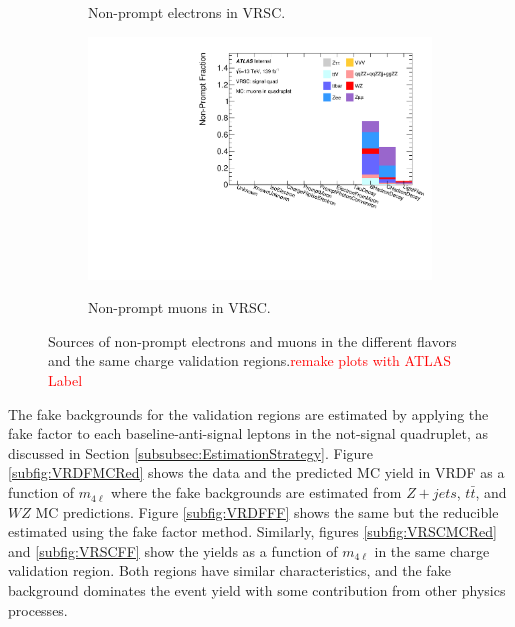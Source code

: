 \begin{figure}[htb]
\begin{subfigure}{.48\textwidth}
    \caption{Non-prompt electrons in VRSC.}
    \end{subfigure}
    \begin{subfigure}{.48\textwidth}
        \centering
        {\includegraphics[width=.9\linewidth]{figures/Analysis/Background/NonPromptCRSCSignal_Muons_.pdf}}\\
        \caption{Non-prompt muons in VRSC.}
    \end{subfigure}
    \caption{ Sources of non-prompt electrons and muons in the different flavors and the same charge validation regions.\textcolor{red}{remake plots with ATLAS Label} \label{fig:VRNonPromptComposition}}
\end{figure}

The fake backgrounds for the validation regions are estimated by applying the fake factor to each baseline-anti-signal leptons in the not-signal quadruplet, as discussed in Section \ref{subsubsec:EstimationStrategy}. Figure \ref{subfig:VRDFMCRed} shows the data and the predicted MC yield in VRDF as a function of $m_{4\ell}$ where the fake backgrounds are estimated from $Z+jets$, $t\bar{t}$, and $WZ$ MC predictions. Figure \ref{subfig:VRDFFF} shows the same but the reducible estimated using the fake factor method. Similarly, figures \ref{subfig:VRSCMCRed} and \ref{subfig:VRSCFF} show the yields as a function of $m_{4\ell}$ in the same charge validation region. Both regions have similar characteristics, and the fake background dominates the event yield with some contribution from other physics processes.

